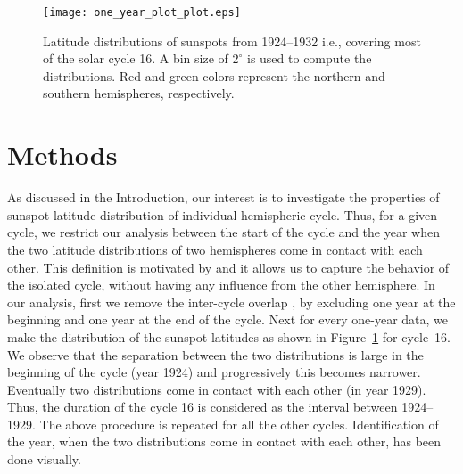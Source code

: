 \documentclass[preprint2,times,tighten]{aastex61}
\newcommand{\Fig}[1]{Figure~\ref{#1}}
\begin{document}
\begin{figure}%
\centering
\texttt{[image: one\_year\_plot\_plot.eps]}
\caption{Latitude distributions of sunspots from 1924--1932 i.e., covering most of the solar cycle 16. A bin size of $2^\circ$ is used to compute the distributions. Red and green colors represent the northern and southern hemispheres, respectively.}
\label{overlap_context}
\end{figure}



\section{Methods}\label{sec:method}
As discussed in the Introduction,
 our interest is to investigate the properties of sunspot latitude distribution 
of individual hemispheric cycle. Thus, for a given cycle, we restrict our analysis between the start of the cycle and 
the year when the two latitude distributions of two hemispheres come in contact with each other. 
This definition is motivated by \citet{CS16} and it allows us to capture the behavior 
of the isolated cycle, without having any influence from the other hemisphere. 
In our analysis, first we remove the inter-cycle overlap \citep{2007ApJ...659..801C}, by excluding one year
at the beginning and one year at the end of the cycle.
Next for every one-year data, we make the distribution of the sunspot latitudes
as shown in \Fig{overlap_context} for cycle~16.
We observe that the separation between the two distributions is large 
in the beginning of the cycle (year 1924) and progressively this becomes narrower.
Eventually two distributions come in contact with each other (in year 1929). 
Thus, the duration of the cycle 16 is considered as the interval between 1924--1929. 
The above procedure is repeated for all the other cycles. 
Identification of the year, when the two distributions come in contact 
with each other, has been done visually. 
\end{document}
